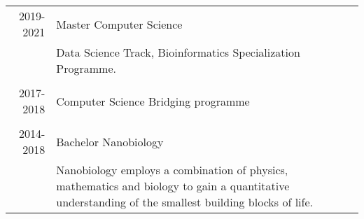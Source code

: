 \documentclass[a4paper,10pt]{article} %
\begin{document}
\begin{tabular}{r|p{13 cm}}

    \textsc{2019-2021} & Master Computer Science \\
                       & \footnotesize{Data Science Track, Bioinformatics Specialization Programme.} \\

\multicolumn{2}{c}{} \\
    \textsc{2017-2018} & Computer Science Bridging programme \\

\multicolumn{2}{c}{} \\
    \textsc{2014-2018} & Bachelor Nanobiology \\
                       & \footnotesize{Nanobiology employs a combination of physics, mathematics and biology to gain a quantitative understanding of the smallest building blocks of life.} \\






\end{tabular}
\end{document}
